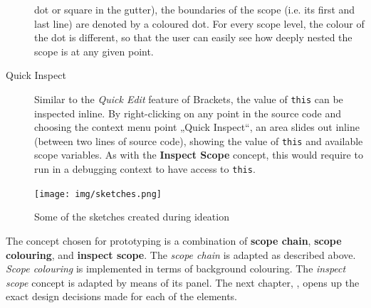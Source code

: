 \begin{description}
dot or square in the gutter), the boundaries of the scope (i.e. its
first and last line) are denoted by a coloured dot. For every scope
level, the colour of the dot is different, so that the user can easily
see how deeply nested the scope is at any given point.
\item[Quick Inspect]
Similar to the \emph{Quick Edit} feature of Brackets, the value of
\texttt{this} can be inspected inline. By right-clicking on any point in
the source code and choosing the context menu point „Quick Inspect“, an
area slides out inline (between two lines of source code), showing the
value of \texttt{this} and available scope variables. As with the
\textbf{Inspect Scope} concept, this would require to run in a debugging
context to have access to \texttt{this}.
\end{description}

\begin{figure}[htbp]
\centering
\texttt{[image: img/sketches.png]}
\caption{Some of the sketches created during ideation}
\label{fig:sketches1}
\end{figure}

The concept chosen for prototyping is a combination of \textbf{scope
chain}, \textbf{scope colouring}, and \textbf{inspect scope}. The
\emph{scope chain} is adapted as described above. \emph{Scope colouring}
is implemented in terms of background colouring. The \emph{inspect
scope} concept is adapted by means of its panel. The next chapter,
, opens up the exact design decisions made for each of
the elements.
